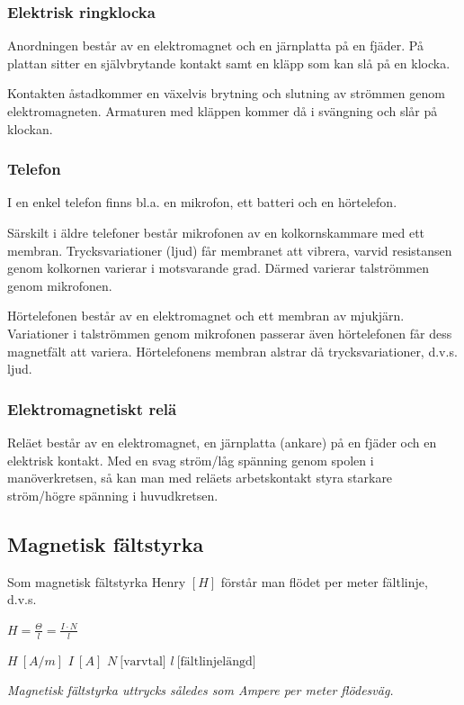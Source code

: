 \subsubsection{Elektrisk ringklocka}
Anordningen består av en elektromagnet och en järnplatta på en fjäder. På plattan
sitter en självbrytande kontakt samt en kläpp som kan slå på en klocka.

Kontakten åstadkommer en växelvis brytning och slutning av strömmen genom
elektromagneten. Armaturen med kläppen kommer då i svängning och slår på
klockan.

\subsubsection{Telefon}
I en enkel telefon finns bl.a. en mikrofon, ett batteri och en hörtelefon.

Särskilt i äldre telefoner består mikrofonen av en kolkornskammare med ett
membran. Trycksvariationer (ljud) får membranet att vibrera, varvid resistansen
genom kolkornen varierar i motsvarande grad. Därmed varierar talströmmen genom
mikrofonen.

Hörtelefonen består av en elektromagnet och ett membran av mjukjärn.
Variationer i talströmmen genom mikrofonen passerar även hörtelefonen får dess
magnetfält att variera. Hörtelefonens membran alstrar då trycksvariationer,
d.v.s. ljud.

\subsubsection{Elektromagnetiskt relä}
Reläet består av en elektromagnet, en järnplatta (ankare) på en fjäder och en
elektrisk kontakt. Med en svag ström/låg spänning genom spolen i
manöverkretsen, så kan man med reläets arbetskontakt styra starkare ström/högre
spänning i huvudkretsen.

\subsection{Magnetisk fältstyrka}

Som magnetisk fältstyrka Henry \([H]\) förstår man flödet per meter fältlinje, d.v.s.

\(H = \frac{\Theta}{l} = \frac{I \cdot N}{l}\)

\(H\ [A/m]\) \(I\ [A]\) \(N\ \text{[varvtal]}\) \(l\ \text{[fältlinjelängd]}\)

\emph{Magnetisk fältstyrka uttrycks således som Ampere per meter flödesväg.}

